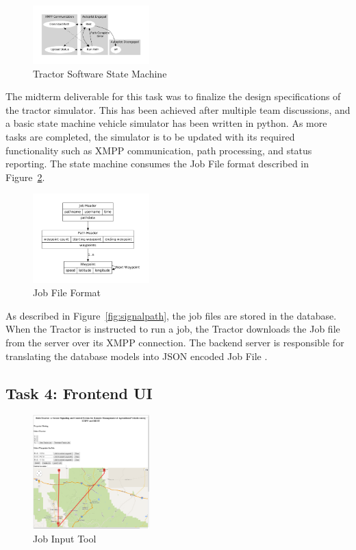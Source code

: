 \documentclass[conference,12pt]{IEEEtran}
\begin{document}
\begin{figure}
\centering
\includegraphics[width=0.4\textwidth]{machine.pdf}
\caption{Tractor Software State Machine}
\label{fig:tractorstatemachine}
\end{figure}
The midterm deliverable for this task was to finalize the design specifications
of the tractor simulator. This has been achieved after multiple team
discussions, and a basic state machine vehicle simulator has been written in
python. As more tasks are completed, the simulator is to be updated with its
required functionality such as XMPP communication, path processing, and status
reporting. The state machine consumes the Job File format described in
Figure~\ref{fig:jobfile}.  

\begin{figure}
\centering
\includegraphics[width=0.4\textwidth]{job_file.pdf}
\caption{Job File Format}
\label{fig:jobfile}
\end{figure}

As described in Figure~\ref{fig:signalpath}, the job files are stored in the
database. When the Tractor is instructed to run a job, the Tractor downloads the
Job file from the server over its XMPP connection. The backend server is
responsible for translating the database models into JSON encoded Job
File \autocite{_json_2014}.

\subsection{Task 4: Frontend UI}
\begin{figure}
\centering
\includegraphics[width=0.4\textwidth]{../PlottingV1.png}
\caption{Job Input Tool}
\label{fig:jobinput}
\end{figure}
\end{document}
